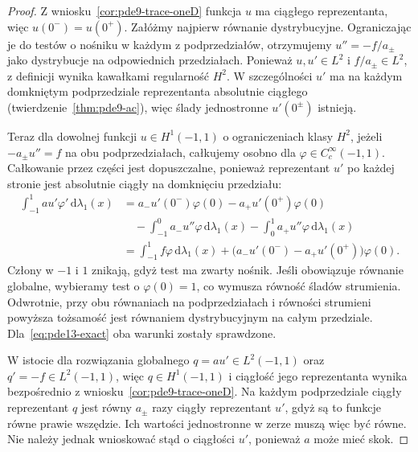 \begin{proof}
Z wniosku~\ref{cor:pde9-trace-oneD} funkcja $u$ ma ciągłego
reprezentanta, więc $u(0^-)=u(0^+)$.
Załóżmy najpierw równanie dystrybucyjne. Ograniczając je
do testów o nośniku w każdym z podprzedziałów, otrzymujemy
$u''=-f/a_\pm$ jako dystrybucje na odpowiednich przedziałach.
Ponieważ $u,u'\in L^2$ i $f/a_\pm\in L^2$, z definicji
wynika kawałkami regularność $H^2$. W szczególności $u'$
ma na każdym domkniętym podprzedziale reprezentanta
absolutnie ciągłego (twierdzenie~\ref{thm:pde9-ac}),
więc ślady jednostronne $u'(0^\pm)$ istnieją.

Teraz dla dowolnej funkcji $u\in H^1(-1,1)$
o ograniczeniach klasy $H^2$, jeżeli $-a_\pm u''=f$
na obu podprzedziałach, całkujemy osobno dla
$\varphi\in C_c^\infty(-1,1)$. Całkowanie przez części
jest dopuszczalne, ponieważ reprezentant $u'$ po każdej
stronie jest absolutnie ciągły na domknięciu przedziału:
\begin{align*}
 \int_{-1}^1 au'\varphi'\,\mathrm d\lambda_1(x)
 &=a_-u'(0^-)\varphi(0)-a_+u'(0^+)\varphi(0)\\
 &\quad-\int_{-1}^0 a_-u''\varphi\,\mathrm d\lambda_1(x)
 -\int_0^1 a_+u''\varphi\,\mathrm d\lambda_1(x)\\
 &=\int_{-1}^1 f\varphi\,\mathrm d\lambda_1(x)
 +\big(a_-u'(0^-)-a_+u'(0^+)\big)\varphi(0).
\end{align*}
Człony w $-1$ i $1$ znikają, gdyż test ma zwarty nośnik.
Jeśli obowiązuje równanie globalne, wybieramy test o
$\varphi(0)=1$, co wymusza równość śladów strumienia.
Odwrotnie, przy obu równaniach na podprzedziałach i równości
strumieni powyższa tożsamość jest równaniem dystrybucyjnym
na całym przedziale. Dla~\eqref{eq:pde13-exact} oba warunki
zostały sprawdzone.

W istocie dla rozwiązania globalnego $q=au'\in L^2(-1,1)$
oraz $q'=-f\in L^2(-1,1)$, więc $q\in H^1(-1,1)$
i ciągłość jego reprezentanta wynika bezpośrednio
z wniosku~\ref{cor:pde9-trace-oneD}. Na każdym podprzedziale
ciągły reprezentant $q$ jest równy $a_\pm$ razy
ciągły reprezentant $u'$, gdyż są to funkcje równe
prawie wszędzie. Ich wartości jednostronne w zerze
muszą więc być równe. Nie należy jednak
wnioskować stąd o ciągłości $u'$, ponieważ $a$ może mieć skok.
\end{proof}

